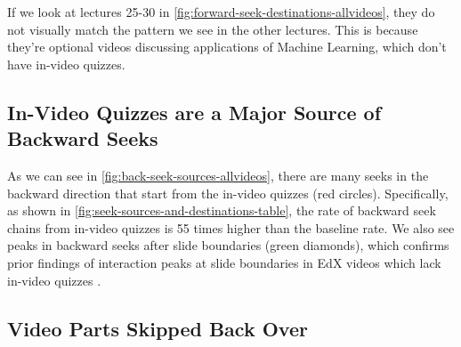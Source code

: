 \documentclass{sigchi}
\begin{document}
If we look at lectures 25-30 in \autoref{fig:forward-seek-destinations-allvideos}, they do not visually match the pattern we see in the other lectures. This is because they're optional videos discussing applications of Machine Learning, which don't have in-video quizzes. %


\subsection{In-Video Quizzes are a Major Source of Backward Seeks}

As we can see in \autoref{fig:back-seek-sources-allvideos}, there are many seeks in the backward direction that start from the in-video quizzes (red circles). Specifically, as shown in \autoref{fig:seek-sources-and-destinations-table}, the rate of backward seek chains from in-video quizzes is 55 times higher than the baseline rate. We also see peaks in backward seeks after slide boundaries (green diamonds), which confirms prior findings of interaction peaks at slide boundaries in EdX videos which lack in-video quizzes \cite{juho}.

\subsection{Video Parts Skipped Back Over}
\end{document}
